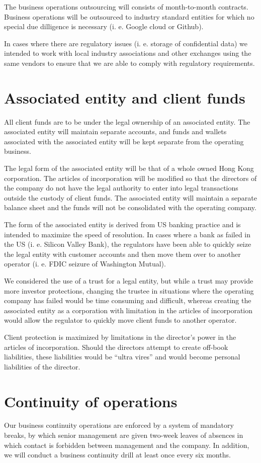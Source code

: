 The business operations outsourcing will consists of month-to-month
contracts.  Business operations will be outsourced to industry
standard entities for which no special due dilligence is necessary
(i. e. Google cloud or Github).

In cases where there are regulatory issues (i. e. storage of
confidential data) we intended to work with local industry
associations and other exchanges using the same vendors to ensure that
we are able to comply with regulatory requirements.

\section{Associated entity and client funds}
All client funds are to be under the legal ownership of an associated
entity.  The associated entity will maintain separate accounts, and
funds and wallets associated with the associated entity will be kept
separate from the operating business.

The legal form of the associated entity will be that of a whole owned
Hong Kong corporation.  The articles of incorporation will be modified
so that the directors of the company do not have the legal authority
to enter into legal transactions outside the custody of client
funds.  The associated entity will maintain a separate balance sheet
and the funds will not be consolidated with the operating company.

The form of the associated entity is derived from US banking practice
and is intended to maximize the speed of resolution.  In cases where a
bank as failed in the US (i. e. Silicon Valley Bank), the regulators
have been able to quickly seize the legal entity with customer
accounts and then move them over to another operator (i. e. FDIC
seizure of Washington Mutual).

We considered the use of a trust for a legal entity, but while a trust
may provide more investor protections, changing the trustee in
situations where the operating company has failed would be time
consuming and difficult, whereas creating the associated entity as a
corporation with limitation in the articles of incorporation would
allow the regulator to quickly move client funds to another operator.

Client protection is maximized by limitations in the director's power
in the articles of incorporation.  Should the directors attempt to
create off-book liabilities, these liabilities would be ``ultra
vires'' and would become personal liabilities of the director.

\section{Continuity of operations}
Our business continuity operations are enforced by a system of
mandatory breaks, by which senior management are given two-week leaves
of absences in which contact is forbidden between management and the
company.  In addition, we will conduct a business continuity drill at
least once every six months.

